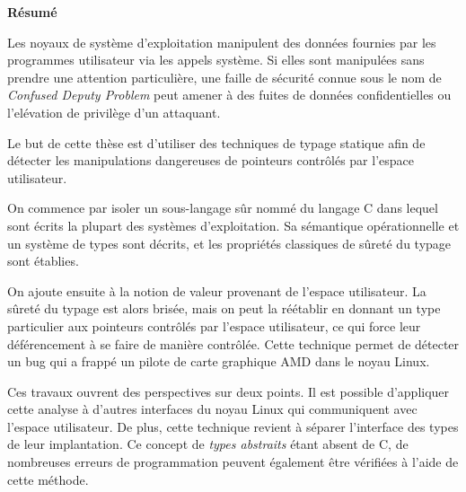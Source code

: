 \cleartoverso{}

\begin{headingpage}
\thispagestyle{empty}

\begin{center}\Large \textbf{Résumé}\end{center}


Les noyaux de système d'exploitation manipulent des données fournies par les
programmes utilisateur via les appels système. Si elles sont manipulées sans
prendre une attention particulière, une faille de sécurité connue sous le nom de
\emph{Confused Deputy Problem} peut amener à des fuites de données
confidentielles ou l'elévation de privilège d'un attaquant.

Le but de cette thèse est d'utiliser des techniques de typage statique afin de
détecter les manipulations dangereuses de pointeurs contrôlés par l'espace
utilisateur.

On commence par isoler un sous-langage sûr nommé \langname{} du langage C dans
lequel sont écrits la plupart des systèmes d'exploitation. Sa sémantique
opérationnelle et un système de types sont décrits, et les propriétés classiques
de sûreté du typage sont établies.

On ajoute ensuite à \langname{} la notion de valeur provenant de l'espace
utilisateur. La sûreté du typage est alors brisée, mais on peut la réétablir en
donnant un type particulier aux pointeurs contrôlés par l'espace utilisateur, ce
qui force leur déférencement à se faire de manière contrôlée. Cette technique
permet de détecter un bug qui a frappé un pilote de carte graphique AMD dans le
noyau Linux.

Ces travaux ouvrent des perspectives sur deux points. Il est possible
d'appliquer cette analyse à d'autres interfaces du noyau Linux qui communiquent
avec l'espace utilisateur. De plus, cette technique revient à séparer
l'interface des types de leur implantation. Ce concept de \emph{types abstraits}
étant absent de C, de nombreuses erreurs de programmation peuvent également être
vérifiées à l'aide de cette méthode.




\end{headingpage}
